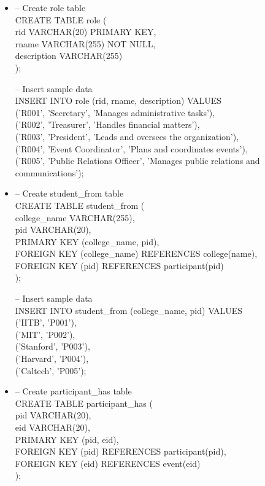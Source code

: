 \documentclass[7pt]{article}
\begin{document}
\begin{itemize}
    \item -- Create role table  \\
    CREATE TABLE role ( \\
        rid VARCHAR(20) PRIMARY KEY,    \\
        rname VARCHAR(255) NOT NULL,    \\
        description VARCHAR(255)    \\
    );  \vspace{2pt}
    
    -- Insert sample data   \\
    INSERT INTO role (rid, rname, description) VALUES   \\
        ('R001', 'Secretary', 'Manages administrative tasks'),  \\
        ('R002', 'Treasurer', 'Handles financial matters'), \\
        ('R003', 'President', 'Leads and oversees the organization'),   \\
        ('R004', 'Event Coordinator', 'Plans and coordinates events'),  \\
        ('R005', 'Public Relations Officer', 'Manages public relations and communications');

    \item -- Create student\_from table \\
    CREATE TABLE student\_from ( \\
        college\_name VARCHAR(255), \\
        pid VARCHAR(20),    \\
        PRIMARY KEY (college\_name, pid),   \\
        FOREIGN KEY (college\_name) REFERENCES college(name),   \\
        FOREIGN KEY (pid) REFERENCES participant(pid)   \\
    );  \vspace{2pt}
    
    -- Insert sample data   \\
    INSERT INTO student\_from (college\_name, pid) VALUES \\
        ('IITB', 'P001'),   \\
        ('MIT', 'P002'),    \\
        ('Stanford', 'P003'),   \\
        ('Harvard', 'P004'),    \\
        ('Caltech', 'P005');

    \item -- Create participant\_has table   \\
    CREATE TABLE participant\_has ( \\
        pid VARCHAR(20),    \\
        eid VARCHAR(20),    \\
        PRIMARY KEY (pid, eid), \\
        FOREIGN KEY (pid) REFERENCES participant(pid),  \\
        FOREIGN KEY (eid) REFERENCES event(eid) \\
    );  \vspace{2pt}


\end{itemize}
\end{document}
